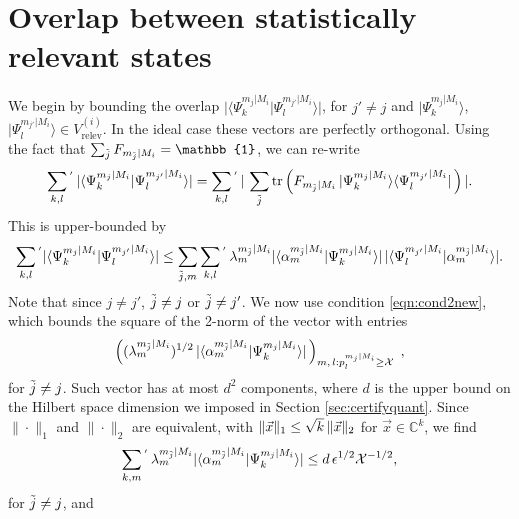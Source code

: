 \section{Overlap between statistically relevant states}
\label{sec:boundingoverlap}
We begin by bounding the overlap $\vert \langle \Psi_k^{m_j\vert M_i}\vert \Psi_l^{m_{j'}\vert M_i}\rangle \vert$, for $j'\neq j$ and $\vert \Psi_k^{m_j\vert M_i}\rangle$, $\vert \Psi_l^{m_{j'}\vert M_i}\rangle \in V_{\text{relev}}^{(i)}$. In the ideal case these vectors are perfectly orthogonal. 
Using the fact that $\sum_{\Tilde{j}}F_{m_{\Tilde{j}}\vert M_i}=\mathbb{1}$, we can re-write
\begin{equation*}
\sum_{k,l}{}^{'}\thinspace\vert\langle \Psi_k^{m_j\vert M_i} \vert \Psi_l^{m_{j'}\vert M_i}\rangle \vert = \sum_{k,l}{}^{'}\thinspace \vert \thinspace\sum_{\Tilde{j}} \operatorname{tr}\left(F_{m_{\Tilde{j}}\vert M_i}\thinspace\vert \Psi_k^{m_j\vert M_i}\rangle\langle \Psi_l^{m_{j'}\vert M_i}\vert\thinspace\right) \vert.
\end{equation*}
This is upper-bounded by
\begin{equation*}
\sum_{k,l}{}^{'}\vert\langle \Psi_k^{m_j\vert M_i} \vert \Psi_l^{m_{j'}\vert M_i}\rangle \vert \leq \sum_{\Tilde{j},m}\sum_{k,l}{}^{'}\thinspace\lambda_m^{m_{\Tilde{j}}\vert M_i}\vert \langle \alpha_m^{m_{\Tilde{j}}\vert M_i} \vert \Psi_k^{m_j\vert M_i} \rangle \vert \thinspace \vert \langle \Psi_l^{m_{j'}\vert M_i}\vert \alpha_m^{m_{\Tilde{j}}\vert M_i} \rangle \vert.
\end{equation*}
Note that since $j\neq j'$, $\Tilde{j}\neq j$ or $\Tilde{j}\neq j'$. We now use condition \ref{eqn:cond2new}, which bounds the square of the 2-norm of the vector with entries
\begin{equation*}
\left((\lambda_m^{m_{\Tilde{j}}\vert M_i})^{1/2}\thinspace \vert \langle \alpha_m^{m_{\Tilde{j}}\vert M_i}\vert \Psi_k^{m_j\vert M_i}\rangle \vert\thinspace\right)_{m,\thinspace l:p_l^{m_j\vert M_i}\geq \mathcal{X}}\;,
\end{equation*} 
for $\Tilde{j}\neq j$. Such vector has at most $d^2$ components, where $d$ is the upper bound on the Hilbert space dimension we imposed in Section \ref{sec:certifyquant}. Since $\|\cdot\|_1$ and $\|\cdot\|_2$ are equivalent, with $\|\vec{x}\|_1\leq \sqrt{k}\thinspace\|\vec{x}\|_2$ for $\vec{x}\in\mathbb{C}^k$, we find
\begin{equation*}
\sum_{k,m}{}^{'}\thinspace\lambda_m^{m_{\Tilde{j}}\vert M_i}\vert \langle \alpha_m^{m_{\Tilde{j}}\vert M_i}\vert \Psi_k^{m_j\vert M_i}\rangle \vert \leq d\thinspace \epsilon^{1/2}\mathcal{X}^{-1/2},
\end{equation*}
for $\Tilde{j}\neq j$, and

